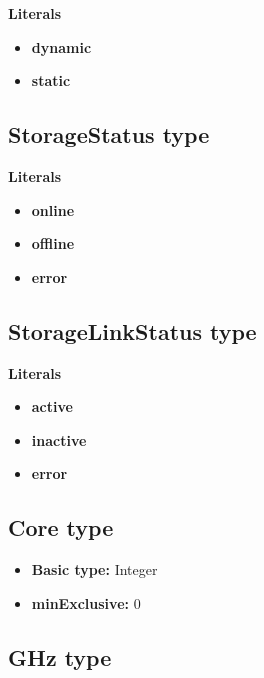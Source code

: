 \documentclass{article}
\begin{document}
\textbf{Literals}
\begin{itemize}
\item \textbf{dynamic}  
\end{itemize}
\begin{itemize}
\item \textbf{static} 
\end{itemize}

\subsection{StorageStatus type}

\textbf{Literals}
\begin{itemize}
\item \textbf{online} 
\end{itemize}
\begin{itemize}
\item \textbf{offline} 
\end{itemize}
\begin{itemize}
\item \textbf{error} 
\end{itemize}

\subsection{StorageLinkStatus type}

\textbf{Literals}
\begin{itemize}
\item \textbf{active} 
\end{itemize}
\begin{itemize}
\item \textbf{inactive} 
\end{itemize}
\begin{itemize}
\item \textbf{error} 
\end{itemize}

\subsection{Core type}

\begin{itemize}
\item \textbf{Basic type:} Integer
	\item \textbf{minExclusive:} 0
\end{itemize}
\subsection{GHz type}
\end{document}
